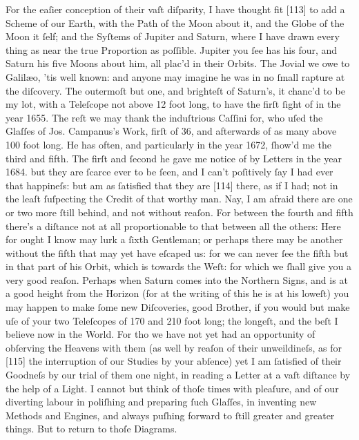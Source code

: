 \documentclass[letterpaper]{book}
\begin{document}
For the eaſier conception of their vaſt diſparity, I have thought
fit [113] to add a Scheme of our Earth, with the Path of the Moon about it,
and the Globe of the Moon it ſelf; and the Syſtems of Jupiter and Saturn,
where I have drawn every thing as near the true Proportion as poſſible.
Jupiter you ſee has his four, and Saturn his five Moons about him, all
plac'd in their Orbits. The Jovial we owe to Galilæo, 'tis well known: and
anyone may imagine he was in no ſmall rapture at the diſcovery. The
outermoſt but one, and brighteſt of Saturn's, it chanc'd to be my lot, with a
Teleſcope not above 12 foot long, to have the firſt ſight of in the year
1655. The reſt we may thank the induſtrious Caſſini for, who uſed the
Glaſſes of Jos.  Campanus's Work, firſt of 36, and afterwards of as many
above 100 foot long. He has often, and particularly in the year 1672, ſhow'd
me the third and fifth. The firſt and ſecond he gave me notice of by Letters
in the year 1684. but they are ſcarce ever to be ſeen, and I can't
poſitively ſay I had ever that happineſs: but am as ſatisfied that they are
[114] there, as if I had; not in the leaſt ſuſpecting the Credit of that
worthy man. Nay, I am afraid there are one or two more ſtill behind, and not
without reaſon. For between the fourth and fifth there's a diſtance not at
all proportionable to that between all the others: Here for ought I know may
lurk a ſixth Gentleman; or perhaps there may be another without the fifth
that may yet have eſcaped us: for we can never ſee the fifth but in that
part of his Orbit, which is towards the Weſt: for which we ſhall give you a
very good reaſon.  Perhaps when Saturn comes into the Northern Signs, and is
at a good height from the Horizon (for at the writing of this he is at his
loweſt) you may happen to make ſome new Diſcoveries, good Brother, if you
would but make uſe of your two Teleſcopes of 170 and 210 foot long; the
longeſt, and the beſt I believe now in the World. For tho we have not yet
had an opportunity of obſerving the Heavens with them (as well by reaſon of
their unweildineſs, as for [115] the interruption of our Studies by your
abſence) yet I am ſatisfied of their Goodneſs by our trial of them one
night, in reading a Letter at a vaſt diſtance by the help of a Light. I
cannot but think of thoſe times with pleaſure, and of our diverting labour
in poliſhing and preparing ſuch Glaſſes, in inventing new Methods and
Engines, and always puſhing forward to ſtill greater and greater things. But
to return to thoſe Diagrams.
\end{document}
